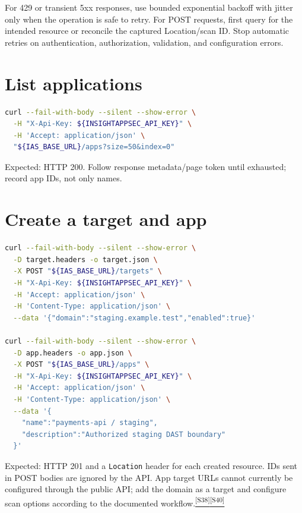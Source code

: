 \documentclass[11pt,letterpaper,oneside]{scrreprt}
\newcommand{\src}[1]{\hyperref[src:#1]{\textsuperscript{\color{R7Orange}[#1]}}}
\newcommand{\code}[1]{\texttt{#1}}
\begin{document}
\begin{oprec}
For 429 or transient 5xx responses, use bounded exponential backoff with jitter only when the operation is safe to retry. For POST requests, first query for the intended resource or reconcile the captured Location/scan ID. Stop automatic retries on authentication, authorization, validation, and configuration errors.
\end{oprec}

\section{List applications}
\begin{lstlisting}[language=bash]
curl --fail-with-body --silent --show-error \
  -H "X-Api-Key: ${INSIGHTAPPSEC_API_KEY}" \
  -H 'Accept: application/json' \
  "${IAS_BASE_URL}/apps?size=50&index=0"
\end{lstlisting}
Expected: HTTP 200. Follow response metadata/page token until exhausted; record app IDs, not only names.

\section{Create a target and app}
\begin{lstlisting}[language=bash]
curl --fail-with-body --silent --show-error \
  -D target.headers -o target.json \
  -X POST "${IAS_BASE_URL}/targets" \
  -H "X-Api-Key: ${INSIGHTAPPSEC_API_KEY}" \
  -H 'Accept: application/json' \
  -H 'Content-Type: application/json' \
  --data '{"domain":"staging.example.test","enabled":true}'

curl --fail-with-body --silent --show-error \
  -D app.headers -o app.json \
  -X POST "${IAS_BASE_URL}/apps" \
  -H "X-Api-Key: ${INSIGHTAPPSEC_API_KEY}" \
  -H 'Accept: application/json' \
  -H 'Content-Type: application/json' \
  --data '{
    "name":"payments-api / staging",
    "description":"Authorized staging DAST boundary"
  }'
\end{lstlisting}
Expected: HTTP 201 and a \code{Location} header for each created resource. IDs sent in POST bodies are ignored by the API. App target URLs cannot currently be configured through the public API; add the domain as a target and configure scan options according to the documented workflow.\src{S38}\src{S40}
\end{document}
